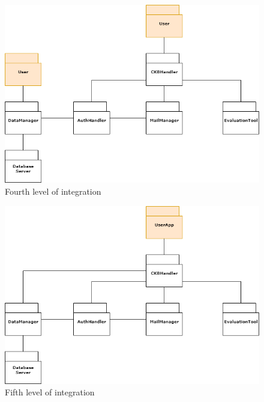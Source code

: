 \begin{figure}[H]
    \centering
    \includegraphics[width=1\textwidth]{images/integration_plan/fourth_level_integration.png}
    \caption{Fourth level of integration}
\end{figure}

\begin{figure}[H]
    \centering
    \includegraphics[width=1\textwidth]{images/integration_plan/fifth_level_integration.png}
    \caption{Fifth level of integration}
\end{figure}


